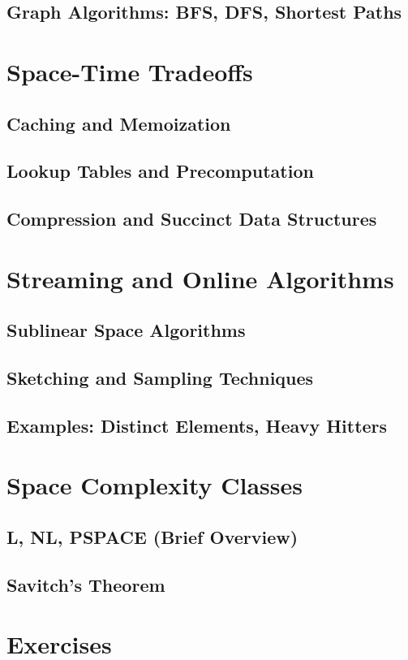 \subsection{Graph Algorithms: BFS, DFS, Shortest Paths}

\section{Space-Time Tradeoffs}
\subsection{Caching and Memoization}
\subsection{Lookup Tables and Precomputation}
\subsection{Compression and Succinct Data Structures}

\section{Streaming and Online Algorithms}
\subsection{Sublinear Space Algorithms}
\subsection{Sketching and Sampling Techniques}
\subsection{Examples: Distinct Elements, Heavy Hitters}

\section{Space Complexity Classes}
\subsection{L, NL, PSPACE (Brief Overview)}
\subsection{Savitch's Theorem}

\section{Exercises}